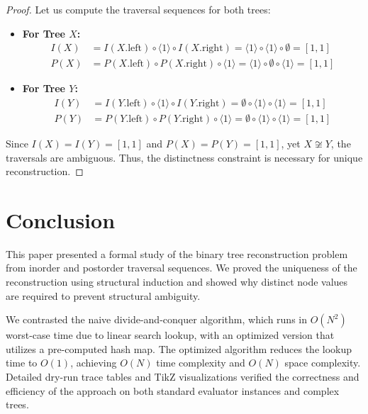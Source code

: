 \documentclass[10pt,journal,compsoc,onecolumn]{IEEEtran}
\begin{document}
\begin{proof}
Let us compute the traversal sequences for both trees:
\begin{itemize}
    \item \textbf{For Tree $X$:}
    \begin{align*}
    I(X) &= I(X.\text{left}) \circ \langle 1 \rangle \circ I(X.\text{right}) = \langle 1 \rangle \circ \langle 1 \rangle \circ \emptyset = [1, 1] \\
    P(X) &= P(X.\text{left}) \circ P(X.\text{right}) \circ \langle 1 \rangle = \langle 1 \rangle \circ \emptyset \circ \langle 1 \rangle = [1, 1]
    \end{align*}
    
    \item \textbf{For Tree $Y$:}
    \begin{align*}
    I(Y) &= I(Y.\text{left}) \circ \langle 1 \rangle \circ I(Y.\text{right}) = \emptyset \circ \langle 1 \rangle \circ \langle 1 \rangle = [1, 1] \\
    P(Y) &= P(Y.\text{left}) \circ P(Y.\text{right}) \circ \langle 1 \rangle = \emptyset \circ \langle 1 \rangle \circ \langle 1 \rangle = [1, 1]
    \end{align*}
\end{itemize}

Since $I(X) = I(Y) = [1, 1]$ and $P(X) = P(Y) = [1, 1]$, yet $X \not\cong Y$, the traversals are ambiguous. Thus, the distinctness constraint is necessary for unique reconstruction.
\end{proof}

\section{Conclusion}
\label{sec:conclusion}

This paper presented a formal study of the binary tree reconstruction problem from inorder and postorder traversal sequences. We proved the uniqueness of the reconstruction using structural induction and showed why distinct node values are required to prevent structural ambiguity. 

We contrasted the naive divide-and-conquer algorithm, which runs in $O(N^2)$ worst-case time due to linear search lookup, with an optimized version that utilizes a pre-computed hash map. The optimized algorithm reduces the lookup time to $O(1)$, achieving $O(N)$ time complexity and $O(N)$ space complexity. Detailed dry-run trace tables and TikZ visualizations verified the correctness and efficiency of the approach on both standard evaluator instances and complex trees.
\end{document}
